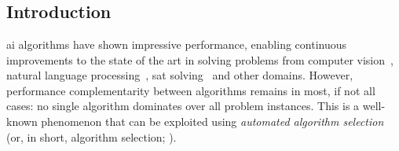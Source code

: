 \chapter{}

\section{Introduction}
\Gls{ai} algorithms have shown impressive performance, enabling   continuous improvements to the state of the art in solving problems from computer vision~\citep{KriEtAl12,TsiEtAl21}, natural language processing~\citep{Gemini}, \gls{sat} solving~\citep{ShaHoo24} and other domains.
However, performance complementarity between algorithms remains in most, if not all cases: no single algorithm dominates over all problem instances.
This is a well-known phenomenon that can be exploited using \textit{automated algorithm selection} (or, in short, algorithm selection; \citealp{Rice76}).


